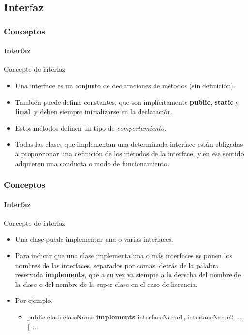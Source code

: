 \documentclass{beamer}
\begin{document}
		\subsection{Interfaz}

		\begin{frame}
			\frametitle{Conceptos}
			\framesubtitle{Interfaz}

			\begin{block}{Concepto de interfaz}
				\begin{itemize}
  					\item Una interface es un conjunto de declaraciones de m\'etodos (sin definici\'on).
					\item Tambi\'en puede definir constantes, que son impl\'icitamente \textbf{public}, \textbf{static} y \textbf{final}, y deben siempre inicializarse en la declaraci\'on.
					\item Estos m\'etodos definen un tipo de {\em comportamiento}.
					\item Todas las clases que implementan una determinada interface est\'an obligadas a proporcionar una definici\'on de los m\'etodos de la interface, y en ese sentido adquieren una conducta o modo de funcionamiento.
				\end{itemize}
			\end{block}
		\end{frame}

		\begin{frame}
			\frametitle{Conceptos}
			\framesubtitle{Interfaz}

			\begin{block}{Concepto de interfaz}
				\begin{itemize}
  					\item Una clase puede implementar una o varias interfaces.
					\item Para indicar que una clase implementa una o m\'as interfaces se ponen los nombres de las interfaces, separados por comas, detr\'as de la palabra reservada \textbf{implements}, que a su vez va siempre a la derecha del nombre de la clase o del nombre de la super-clase en el caso de herencia.
					\item Por ejemplo,
					\begin{itemize}
  						\item public class className \textbf{implements} interfaceName1, interfaceName2, ... \{ ...
					\end{itemize}
				\end{itemize}
			\end{block}
		\end{frame}
\end{document}
